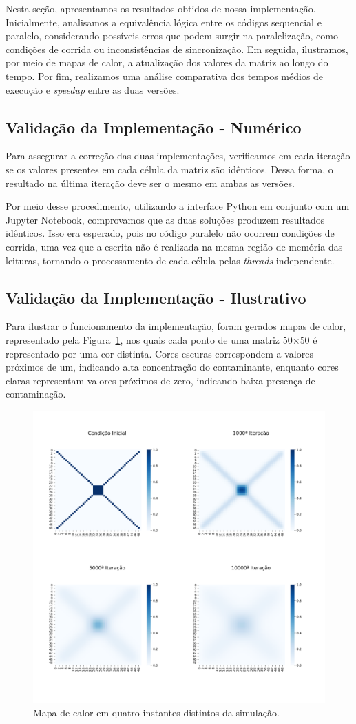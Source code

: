\documentclass[12pt]{article}
\begin{document}
Nesta seção, apresentamos os resultados obtidos de nossa implementação.
Inicialmente, analisamos a equivalência lógica entre os códigos sequencial e
paralelo, considerando possíveis erros que podem surgir na paralelização, como
condições de corrida ou inconsistências de sincronização. Em seguida,
ilustramos, por meio de mapas de calor, a atualização dos valores da matriz ao
longo do tempo. Por fim, realizamos uma análise comparativa dos tempos médios
de execução e \textit{speedup} entre as duas versões.

\subsection{Validação da Implementação - Numérico}

Para assegurar a correção das duas implementações, verificamos em cada iteração
se os valores presentes em cada célula da matriz são idênticos. Dessa forma, o
resultado na última iteração deve ser o mesmo em ambas as versões.

Por meio desse procedimento, utilizando a interface Python em conjunto com um
Jupyter Notebook, comprovamos que as duas soluções produzem resultados
idênticos. Isso era esperado, pois no código paralelo não ocorrem condições de
corrida, uma vez que a escrita não é realizada na mesma região de memória das
leituras, tornando o processamento de cada célula pelas \textit{threads}
independente.

\subsection{Validação da Implementação - Ilustrativo}

Para ilustrar o funcionamento da implementação, foram gerados mapas de calor,
representado pela Figura~\ref{fig:heatmap}, nos quais cada ponto de uma matriz
50$\times$50 é representado por uma cor distinta. Cores escuras correspondem a
valores próximos de um, indicando alta concentração do contaminante, enquanto
cores claras representam valores próximos de zero, indicando baixa presença de
contaminação.

\begin{figure}[ht]
  \centering
  \includegraphics[width=.4\textwidth]{figs/heatmap.png}
  \caption{Mapa de calor em quatro instantes distintos da simulação.}\label{fig:heatmap}
\end{figure}
\end{document}
